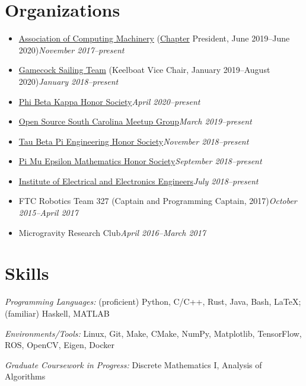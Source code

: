 \documentclass[\ifdefined\cv10pt\else10pt\fi,letterpaper]{moderncv}
\newcommand{\cvonly}[1]{\ifdefined\cv#1\fi\ignorespaces}
\renewcommand{\cvitem}[2]{\item {#1}\hfill\textit{#2}}
\let\oldsection\section
\renewcommand{\section}[1]{\vspace*{-1.3ex}\oldsection{#1}\vspace*{-0.5ex}}
\begin{document}
\section{\textbf{Organizations}}
\begin{itemize}
	\cvitem{\href{https://www.acm.org/}{Association of Computing Machinery} (\href{https://acm.cse.sc.edu/}{Chapter} President, June 2019--June 2020)}{November 2017--present}
	\cvitem{\href{https://www.gamecocksailing.com/}{Gamecock Sailing Team} (Keelboat Vice Chair, January 2019--August 2020)}{January 2018--present}
	\cvitem{\href{https://www.pbk.org/}{Phi Beta Kappa Honor Society}}{April 2020--present}
	\cvitem{\href{https://www.meetup.com/Open-Source-South-Carolina/}{Open Source South Carolina Meetup Group}}{March 2019--present}
	\cvitem{\href{https://tbp.org/}{Tau Beta Pi Engineering Honor Society}}{November 2018--present}
	\cvitem{\href{https://pme-math.org/}{Pi Mu Epsilon Mathematics Honor Society}}{September 2018--present}
	\cvitem{\href{https://www.ieee.org/}{Institute of Electrical and Electronics Engineers}}{July 2018--present}
	\cvonly{
		\cvitem{FTC Robotics Team 327 (Captain and Programming Captain, 2017)}{October 2015--April 2017}
		\cvitem{Microgravity Research Club}{April 2016--March 2017}
	}
\end{itemize}

\section{Skills}
\textit{Programming Languages:} (proficient) Python, C/C++, Rust, Java, Bash, \LaTeX; (familiar) Haskell, MATLAB \par
\textit{Environments/Tools:} Linux, Git, Make, CMake, NumPy, Matplotlib, TensorFlow, ROS, OpenCV, Eigen, Docker \par
\textit{Graduate Coursework in Progress:} Discrete Mathematics I, Analysis of Algorithms
\end{document}
